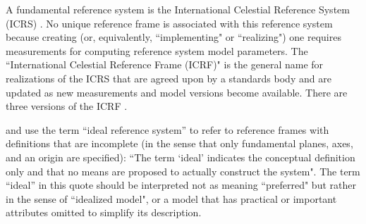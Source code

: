 \documentclass[draft]{agujournal2019}
\begin{document}

A fundamental reference system is the International Celestial Reference System (ICRS) \cite{Petit2010}. No unique reference frame is associated with this reference system because creating (or, equivalently, ``implementing" or ``realizing") one requires measurements for computing reference system model parameters. The ``International Celestial Reference Frame (ICRF)" is the general name for realizations of the ICRS that are agreed upon by a standards body and are updated as new measurements and model versions become available. There are three versions of the ICRF \cite{Charlot2020}. 

 and  use the term ``ideal reference system'' to refer to reference frames with definitions that are incomplete (in the sense that only fundamental planes, axes, and an origin are specified): ``The term `ideal' indicates the conceptual definition only and that no means are proposed to actually construct the system". The term ``ideal'' in this quote should be interpreted not as meaning ``preferred" but rather in the sense of ``idealized model", or a model that has practical or important attributes omitted to simplify its description.


\end{document}
